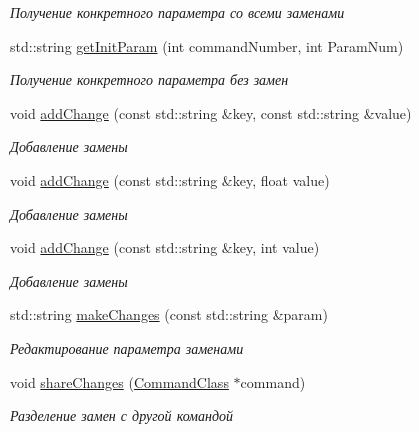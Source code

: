 \begin{DoxyCompactItemize}
\begin{DoxyCompactList}\small\item\em Получение конкретного параметра со всеми заменами \end{DoxyCompactList}\item 
std\+::string \hyperlink{class_command_class_a43dde13edd9aab7d6102f074ea1967cb}{get\+Init\+Param} (int command\+Number, int Param\+Num)
\begin{DoxyCompactList}\small\item\em Получение конкретного параметра без замен \end{DoxyCompactList}\item 
void \hyperlink{class_command_class_a30ed51838ac94117d32d4906f492af85}{add\+Change} (const std\+::string \&key, const std\+::string \&value)
\begin{DoxyCompactList}\small\item\em Добавление замены \end{DoxyCompactList}\item 
void \hyperlink{class_command_class_aa90e14774bf908cd1d105c38c9e9b878}{add\+Change} (const std\+::string \&key, float value)
\begin{DoxyCompactList}\small\item\em Добавление замены \end{DoxyCompactList}\item 
void \hyperlink{class_command_class_ae582bbc8ea3245a2a5908bdab97f11e9}{add\+Change} (const std\+::string \&key, int value)
\begin{DoxyCompactList}\small\item\em Добавление замены \end{DoxyCompactList}\item 
std\+::string \hyperlink{class_command_class_aa61ed7cacbaf102c7f36288eba2c06df}{make\+Changes} (const std\+::string \&param)
\begin{DoxyCompactList}\small\item\em Редактирование параметра заменами \end{DoxyCompactList}\item 
void \hyperlink{class_command_class_ab345ed83c10eeb74a976061566b62793}{share\+Changes} (\hyperlink{class_command_class}{Command\+Class} $\ast$command)
\begin{DoxyCompactList}\small\item\em Разделение замен с другой командой \end{DoxyCompactList}\end{DoxyCompactItemize}
